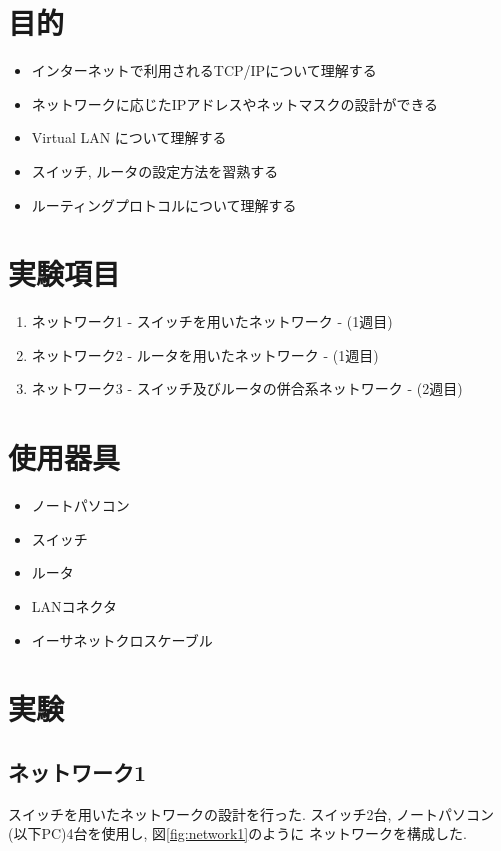 \documentclass{jsarticle}
\begin{document}
\newpage


\section{目的}
\begin{itemize}
	\item インターネットで利用されるTCP/IPについて理解する
	\item ネットワークに応じたIPアドレスやネットマスクの設計ができる
	\item Virtual LAN について理解する
	\item スイッチ, ルータの設定方法を習熟する
	\item ルーティングプロトコルについて理解する 
\end{itemize}

\section{実験項目}
\begin{enumerate}[1)]
	\item ネットワーク1 - スイッチを用いたネットワーク - (1週目)
	\item ネットワーク2 - ルータを用いたネットワーク - (1週目)
	\item ネットワーク3 - スイッチ及びルータの併合系ネットワーク - (2週目)
\end{enumerate}

\section{使用器具}
\begin{itemize}
	\item ノートパソコン
	\item スイッチ
	\item ルータ
	\item LANコネクタ
	\item イーサネットクロスケーブル
\end{itemize}


\section{実験}

\subsection{ネットワーク1}
スイッチを用いたネットワークの設計を行った. スイッチ2台, ノートパソコン(以下PC)4台を使用し, 図\ref{fig:network1}のように
ネットワークを構成した. 
\end{document}
